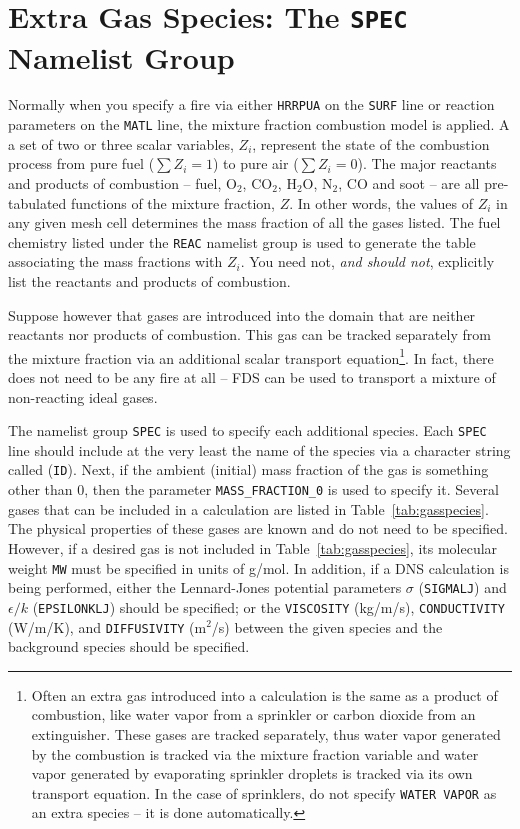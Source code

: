 \documentclass[11pt]{book}
\newcommand{\ct}{\tt\small}
\begin{document}
\clearpage

\section{Extra Gas Species: The \texorpdfstring{{\tt SPEC}}{SPEC} Namelist Group}
\label{info:SPEC}

Normally when you specify a fire via either {\ct HRRPUA} on the {\ct SURF} line or
reaction parameters on the {\ct MATL} line, the mixture fraction combustion model
is applied. A a set of two or three scalar variables, $Z_i$, represent the state of
the combustion process from pure fuel ($\sum Z_i=1$) to pure air ($\sum Z_i=0$).
The major reactants and products of combustion -- fuel, O$_2$, CO$_2$,
H$_2$O, N$_2$, CO and soot -- are all pre-tabulated functions of
the mixture fraction, $Z$. In other words, the values of $Z_i$ in any
given mesh cell determines the mass fraction of all the gases listed.
The fuel chemistry listed under the {\ct REAC} namelist
group is used to generate the table associating the mass fractions
with $Z_i$. You need not, {\em and should not},
explicitly list the reactants and products of combustion.

Suppose however that gases are introduced into the
domain that are neither reactants nor products of combustion.
This gas can be tracked separately from the mixture fraction via an additional scalar transport equation\footnote{
Often an extra gas introduced into a calculation is the same as a
product of combustion, like water vapor from a sprinkler or carbon
dioxide from an extinguisher. These gases are tracked separately,
thus water vapor generated by the combustion is tracked via the
mixture fraction variable and water vapor generated by evaporating
sprinkler droplets is tracked via its own transport equation. In the
case of sprinklers, do not specify {\ct WATER VAPOR} as
an extra species -- it is done automatically.}.
In fact, there does not need to be any fire
at all -- FDS can be used to transport a mixture of non-reacting
ideal gases.

The namelist group {\ct SPEC} is used to specify each additional
species. Each {\ct SPEC} line should include at the very least
the name of the species via a character string called ({\ct ID}).
Next, if the ambient (initial) mass fraction of the gas is something
other than 0, then the parameter {\ct MASS\_FRACTION\_0} is used to
specify it.
Several gases that can be included in a calculation are listed in
Table~\ref{tab:gasspecies}. The physical properties
of these gases are known and do not need to be specified. However, if a
desired gas is not included in Table~\ref{tab:gasspecies}, its
molecular weight {\ct MW} must be specified in units of g/mol.
In addition, if a DNS calculation is being performed, either
the Lennard-Jones potential parameters $\sigma$ ({\ct SIGMALJ}) and
$\epsilon/k$ ({\ct EPSILONKLJ}) should be specified; or
the {\ct VISCOSITY} (kg/m/s), {\ct CONDUCTIVITY} (W/m/K), and
{\ct DIFFUSIVITY} (m$^2$/s) between the given species
and the background species should be specified.
\end{document}
